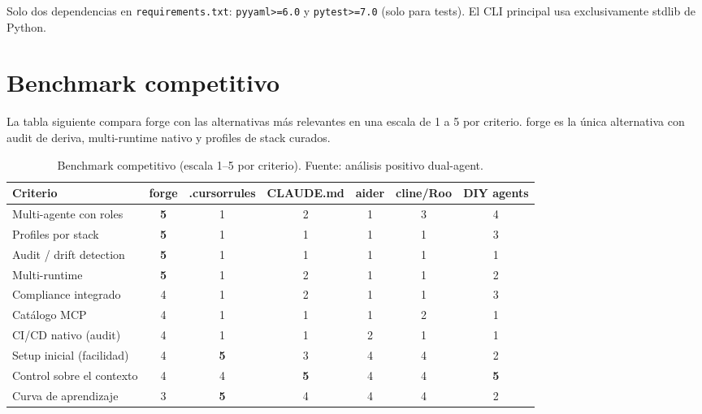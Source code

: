 \documentclass[11pt,a4paper]{article}
\begin{document}
Solo dos dependencias en \texttt{requirements.txt}: \texttt{pyyaml>=6.0} y \texttt{pytest>=7.0} (solo para tests). El CLI principal usa exclusivamente stdlib de Python.

\section{Benchmark competitivo}

La tabla siguiente compara forge con las alternativas más relevantes en una escala de 1 a 5 por criterio. forge es la única alternativa con audit de deriva, multi-runtime nativo y profiles de stack curados.

\begin{table}[h!]
\centering
\small
\begin{tabular}{lcccccc}
\toprule
\textbf{Criterio} & \textbf{forge} & \textbf{.cursorrules} & \textbf{CLAUDE.md} & \textbf{aider} & \textbf{cline/Roo} & \textbf{DIY agents} \\
\midrule
Multi-agente con roles        & \textbf{5} & 1 & 2 & 1 & 3 & 4 \\
Profiles por stack            & \textbf{5} & 1 & 1 & 1 & 1 & 3 \\
Audit / drift detection       & \textbf{5} & 1 & 1 & 1 & 1 & 1 \\
Multi-runtime                 & \textbf{5} & 1 & 2 & 1 & 1 & 2 \\
Compliance integrado          & 4 & 1 & 2 & 1 & 1 & 3 \\
Catálogo MCP                  & 4 & 1 & 1 & 1 & 2 & 1 \\
CI/CD nativo (audit)          & 4 & 1 & 1 & 2 & 1 & 1 \\
Setup inicial (facilidad)     & 4 & \textbf{5} & 3 & 4 & 4 & 2 \\
Control sobre el contexto     & 4 & 4 & \textbf{5} & 4 & 4 & \textbf{5} \\
Curva de aprendizaje          & 3 & \textbf{5} & 4 & 4 & 4 & 2 \\
\bottomrule
\end{tabular}
\caption{Benchmark competitivo (escala 1--5 por criterio). Fuente: análisis positivo dual-agent.}
\end{table}

\end{document}
